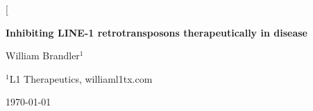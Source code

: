 \documentclass[11pt,twocolumn,twoside]{extarticle}
\begin{document}
\twocolumn[%
{\sffamily\bfseries\fontsize{15.5}{18.5}\selectfont
Inhibiting LINE-1 retrotransposons therapeutically in disease\par}
\vspace{0.55em}
{\normalsize William Brandler$^{1}$\,\par}
\vspace{0.25em}
{\small $^{1}$L1 Therapeutics, william{}l1tx.com\par}
\vspace{0.35em}
{\normalsize\today\par}
\vspace{0.65em}
\setlength{\fboxsep}{8pt}%
\setlength{\fboxrule}{0.6pt}%
\noindent{}
\end{document}
